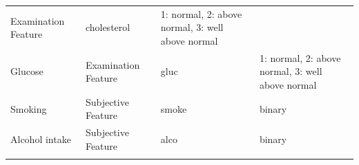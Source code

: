 \documentclass[11pt]{article}
\begin{document}
\begin{longtable}[]{@{}llll@{}}
\begin{minipage}[t]{0.18\columnwidth}
Examination Feature\strut
\end{minipage} & \begin{minipage}[t]{0.20\columnwidth}\raggedright\strut
cholesterol\strut
\end{minipage} & \begin{minipage}[t]{0.16\columnwidth}\raggedright\strut
1: normal, 2: above normal, 3: well above normal\strut
\end{minipage}\tabularnewline
\begin{minipage}[t]{0.12\columnwidth}\raggedright\strut
Glucose\strut
\end{minipage} & \begin{minipage}[t]{0.18\columnwidth}\raggedright\strut
Examination Feature\strut
\end{minipage} & \begin{minipage}[t]{0.20\columnwidth}\raggedright\strut
gluc\strut
\end{minipage} & \begin{minipage}[t]{0.16\columnwidth}\raggedright\strut
1: normal, 2: above normal, 3: well above normal\strut
\end{minipage}\tabularnewline
\begin{minipage}[t]{0.12\columnwidth}\raggedright\strut
Smoking\strut
\end{minipage} & \begin{minipage}[t]{0.18\columnwidth}\raggedright\strut
Subjective Feature\strut
\end{minipage} & \begin{minipage}[t]{0.20\columnwidth}\raggedright\strut
smoke\strut
\end{minipage} & \begin{minipage}[t]{0.16\columnwidth}\raggedright\strut
binary\strut
\end{minipage}\tabularnewline
\begin{minipage}[t]{0.12\columnwidth}\raggedright\strut
Alcohol intake\strut
\end{minipage} & \begin{minipage}[t]{0.18\columnwidth}\raggedright\strut
Subjective Feature\strut
\end{minipage} & \begin{minipage}[t]{0.20\columnwidth}\raggedright\strut
alco\strut
\end{minipage} & \begin{minipage}[t]{0.16\columnwidth}\raggedright\strut
binary\strut
\end{minipage}\tabularnewline
\begin{minipage}[t]{0.12\columnwidth}\raggedright\strut

\end{minipage}
\end{longtable}
\end{document}
